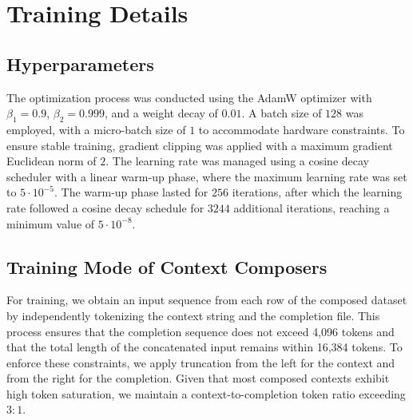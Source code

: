 \section{Training Details}
\label{appendix:training}

\subsection{Hyperparameters}
\label{appendix:training-hyperparams}
The optimization process was conducted using the AdamW optimizer with $\beta_1=0.9$, $\beta_2 = 0.999$, and a weight decay of $0.01$. A batch size of $128$ was employed, with a micro-batch size of $1$ to accommodate hardware constraints. To ensure stable training, gradient clipping was applied with a maximum gradient Euclidean norm of $2$. The learning rate was managed using a cosine decay scheduler with a linear warm-up phase, where the maximum learning rate was set to $5 \cdot 10^{-5}$. The warm-up phase lasted for $256$ iterations, after which the learning rate followed a cosine decay schedule for $3244$ additional iterations, reaching a minimum value of $5 \cdot 10^{-8}$.

\subsection{Training Mode of Context Composers}
\label{appendix:training-cococo} %
For training, we obtain an input sequence from each row of the composed dataset by independently tokenizing the context string and the completion file. This process ensures that the completion sequence does not exceed 4,096 tokens and that the total length of the concatenated input remains within 16,384 tokens. To enforce these constraints, we apply truncation from the left for the context and from the right for the completion. Given that most composed contexts exhibit high token saturation, we maintain a context-to-completion token ratio exceeding $3:1$.
